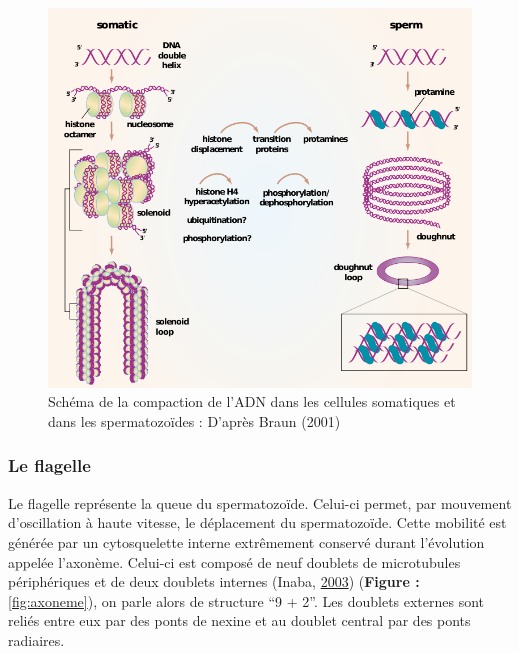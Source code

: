 \documentclass[12pt,twoside]{reedthesis}
\theoremstyle{definition}
\theoremstyle{definition}
\theoremstyle{remark}
\begin{document}
  \begin{figure}
  
  {\centering \includegraphics[scale=.55]{figure/noyau} 
  
  }
  
  \caption[Schéma de la compaction de l’ADN dans les cellules somatiques et dans les spermatozoïdes]{Schéma de la compaction de l’ADN dans les cellules somatiques et dans les spermatozoïdes : D'après Braun (2001)}\label{fig:noyau}
  \end{figure}
  
  \subsubsection{Le flagelle}\label{le-flagelle}
  
  Le flagelle représente la queue du spermatozoïde. Celui-ci permet, par
  mouvement d'oscillation à haute vitesse, le déplacement du
  spermatozoïde. Cette mobilité est générée par un cytosquelette interne
  extrêmement conservé durant l'évolution appelée l'axonème. Celui-ci est
  composé de neuf doublets de microtubules périphériques et de deux
  doublets internes (Inaba, \protect\hyperlink{ref-Inaba2003}{2003})
  (\textbf{Figure : }\ref{fig:axoneme}), on parle alors de structure ``9 +
  2''. Les doublets externes sont reliés entre eux par des ponts de nexine
  et au doublet central par des ponts radiaires.
  
\end{document}
